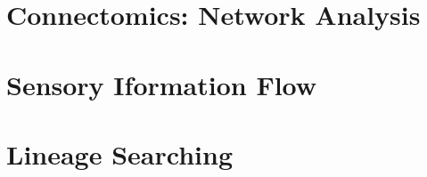 \clearpage


\tochide\section{Connectomics: Network Analysis}

\section*{Sensory Iformation Flow}
\section*{Lineage Searching}















